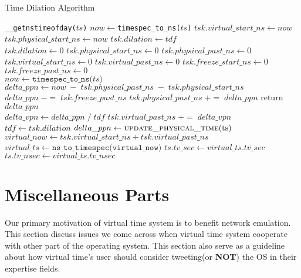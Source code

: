 \documentclass{acm_proc_article-sp}
\begin{document}
\begin{algorithm*}[t]
\caption{Time Dilation Algorithm}%
\label{Alg-DilateTimeKeeping}
\begin{algorithmic}[1]
    \State \texttt{\_\_getnstimeofday($ts$)}
    \State $now \gets $\texttt{timespec\_to\_ns($ts$)}
    \State $tsk.virtual\_start\_ns \gets now $
    \State $tsk.physical\_start\_ns \gets now $
    \State $tsk.dilation \gets tdf$
\EndIf
\EndFunction
\\
\State $tsk.dilation \gets 0$
\State $tsk.physical\_start\_ns \gets 0$
\State $tsk.physical\_past\_ns \gets 0$
\State $tsk.virtual\_start\_ns \gets 0$
\State $tsk.virtual\_past\_ns \gets 0$
\State $tsk.freeze\_start\_ns \gets 0$
\State $tsk.freeze\_past\_ns \gets 0$
\EndFunction
\\
\State $now \gets \texttt{timespec\_to\_ns($ts$)}$
\State $delta\_ppn \gets now \; - \; tsk.physical\_past\_ns \; - \; tsk.physical\_start\_ns$
\State $delta\_ppn \; -= \; tsk.freeze\_past\_ns$
\State $tsk.physical\_past\_ns \; += \; delta\_ppn$
\State return $delta\_ppn$
\EndFunction
\\
	\State $delta\_vpn \gets delta\_ppn \; / \; tdf$
	\State $tsk.virtual\_past\_ns \; += \; delta\_vpn$
\EndIf
\EndFunction
\\
\State $tdf \gets tsk.dilation$
	\State $delta\_ppn \gets \Call{update\_physical\_time}{$ts$}$
	\State {}
	\State $virtual\_now \gets tsk.virtual\_start\_ns + tsk.virtual\_past\_ns$
	\State $virtual\_ts \gets \texttt{ns\_to\_timespec(virtual\_now)}$
	\State $ts.tv\_sec \gets virtual\_ts.tv\_sec$
	\State $ts.tv\_nsec \gets virtual\_ts.tv\_nsec$
\EndIf
\EndFunction
\end{algorithmic}
\end{algorithm*}

\section{Miscellaneous Parts}
Our primary motivation of virtual time system is to benefit network emulation. This section discuss issues we come across when virtual time system cooperate with other part of the operating system. This section also serve as a guideline about how virtual time's user should consider tweeting(or \textbf{NOT}) the OS in their expertise fields. 
\end{document}
